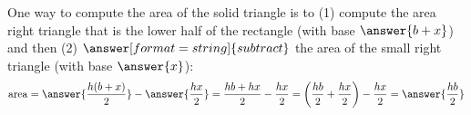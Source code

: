 \documentclass[nooutcomes,space,handout]{ximera}
\begin{document}
\begin{problem}
\begin{problem}
One way to compute the area of the solid triangle is to (1) compute the area right triangle that is the lower half of the rectangle (with base $\answer{b+x}$) and then (2) $\answer[format=string]{subtract}$ the area of the small right triangle (with base $\answer{x}$): 
\[
\mathrm{area} =  \answer{\frac{h(b+x)}{2}} - \answer{\frac{hx}{2}}= \frac{hb+hx}{2} - \frac{hx}{2}
= \left(\frac{hb}{2} + \frac{hx}{2}\right) - \frac{hx}{2} = \answer{\frac{hb}{2}}
\]
\end{problem}
\end{problem}
\end{document}
